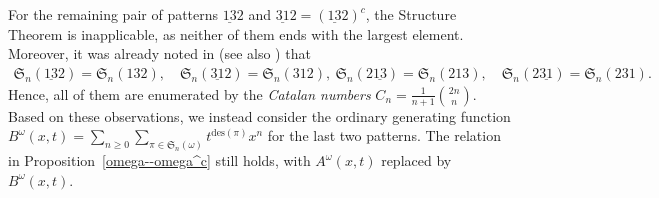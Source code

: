 \documentclass[11pt,reqno]{amsart}
\numberwithin{equation}{section}
\theoremstyle{plain}
\theoremstyle{definition}
\renewcommand{\S}{\mathfrak{S}}
\def\des{\mathrm{des}}
\begin{document}
For the remaining pair of patterns $\underline{13}2$ and $\underline{31}2 = (\underline{13}2)^c$, the Structure Theorem is inapplicable, as neither of them ends with the largest element. Moreover, it was already noted in \cite[Lem.\ 2]{cla01} (see also \cite[Lem.\ 2.8]{FTHZ19}) that \begin{align*} \S_n(\underline{13}2) = \S_n(132), \quad \S_n(\underline{31}2) = \S_n(312), \ \S_n(2\underline{13}) = \S_n(213), \quad \S_n(2\underline{31}) = \S_n(231). \end{align*} Hence, all of them are enumerated by the {\em Catalan numbers} $C_n = \frac{1}{n+1}\binom{2n}{n}$. Based on these observations, we instead consider the ordinary generating function $B^{\omega}(x,t) = \sum_{n \geq 0} \sum_{\pi \in \S_n(\omega)} t^{\des(\pi)} x^n$ for the last two patterns. The relation in Proposition~\ref{omega--omega^c} still holds, with $A^{\omega}(x,t)$ replaced by $B^{\omega}(x,t)$.
\end{document}
